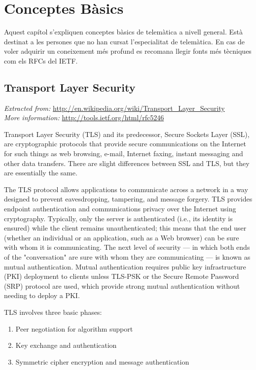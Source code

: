 \chapter{Conceptes B\`asics}
Aquest capítol s'expliquen conceptes bàsics de telemàtica a nivell general. Està destinat a les persones que no han cursat l'especialitat de telemàtica. En cas de voler adquirir un coneixement més profund es recomana llegir fonts més tècniques com els RFCs del IETF.
 
\section{Transport Layer Security}
\emph{Extracted from:} \url{http://en.wikipedia.org/wiki/Transport_Layer_Security}\\
\emph{More information:} \url{http://tools.ietf.org/html/rfc5246}

Transport Layer Security (TLS) and its predecessor, Secure Sockets Layer (SSL), are cryptographic protocols that provide secure communications on the Internet for such things as web browsing, e-mail, Internet faxing, instant messaging and other data transfers. There are slight differences between SSL and TLS, but they are essentially the same.

The TLS protocol allows applications to communicate across a network in a way designed to prevent eavesdropping, tampering, and message forgery. TLS provides endpoint authentication and communications privacy over the Internet using cryptography. Typically, only the server is authenticated (i.e., its identity is ensured) while the client remains unauthenticated; this means that the end user (whether an individual or an application, such as a Web browser) can be sure with whom it is communicating. The next level of security --- in which both ends of the "conversation" are sure with whom they are communicating --- is known as mutual authentication. Mutual authentication requires public key infrastructure (PKI) deployment to clients unless TLS-PSK or the Secure Remote Password (SRP) protocol are used, which provide strong mutual authentication without needing to deploy a PKI.

TLS involves three basic phases:
\begin{enumerate}
\item Peer negotiation for algorithm support
\item Key exchange and authentication
\item Symmetric cipher encryption and message authentication
\end{enumerate}

